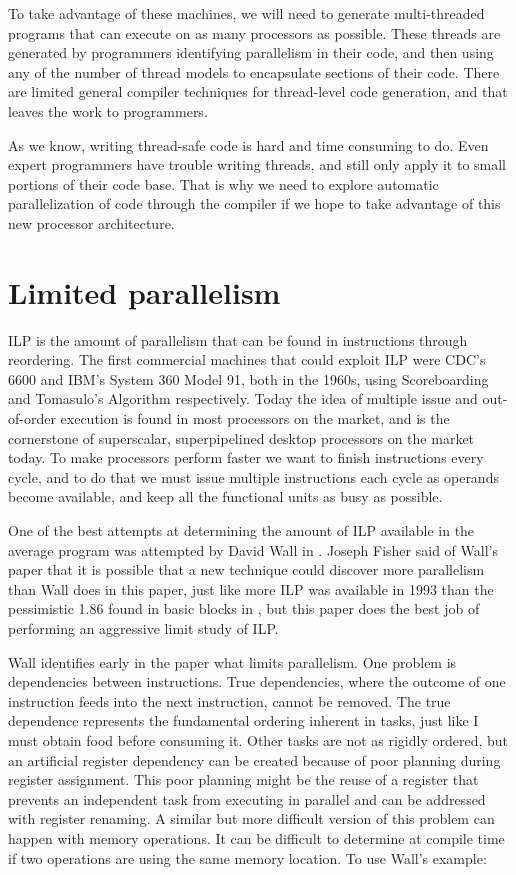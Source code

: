 \documentclass[12pt,twoside,letterpaper]{article}
\begin{document}
To take advantage of these machines, we will need to generate multi-threaded programs that can execute on as many processors as possible. These threads are generated by programmers identifying parallelism in their code, and then using any of the number of thread models to encapsulate sections of their code. There are limited general compiler techniques for thread-level code generation, and that leaves the work to programmers.

As we know, writing thread-safe code is hard and time consuming to do. Even expert programmers have trouble writing threads, and still only apply it to small portions of their code base. That is why we need to explore automatic parallelization of code through the compiler if we hope to take advantage of this new processor architecture.

\section*{Limited parallelism}
ILP is the amount of parallelism that can be found in instructions through reordering. The first commercial machines that could exploit ILP were CDC’s 6600 and IBM’s System 360 Model 91, both in the 1960s, using Scoreboarding and Tomasulo’s Algorithm respectively. Today the idea of multiple issue and out-of-order execution is found in most processors on the market, and is the cornerstone of superscalar, superpipelined desktop processors on the market today. To make processors perform faster we want to finish instructions every cycle, and to do that we must issue multiple instructions each cycle as operands become available, and keep all the functional units as busy as possible.

One of the best attempts at determining the amount of ILP available in the average program was attempted by David Wall in \cite{Wall:1991p191}. Joseph Fisher said of Wall's paper \cite{Rau:1992p211} that it is possible that a new technique could discover more parallelism than Wall does in this paper, just like more ILP was available in 1993 than the pessimistic 1.86 found in basic blocks in \cite{Tjaden:1970p214}, but this paper does the best job of performing an aggressive limit study of ILP.

Wall identifies early in the paper what limits parallelism. One problem is dependencies between instructions. True dependencies, where the outcome of one instruction feeds into the next instruction, cannot be removed. The true dependence represents the fundamental ordering inherent in tasks, just like I must obtain food before consuming it. Other tasks are not as rigidly ordered, but an artificial register dependency can be created because of poor planning during register assignment. This poor planning might be the reuse of a register that prevents an independent task from executing in parallel and can be addressed with register renaming. A similar but more difficult version of this problem can happen with memory operations. It can be difficult to determine at compile time if two operations are using the same memory location. To use Wall's example:
\end{document}
